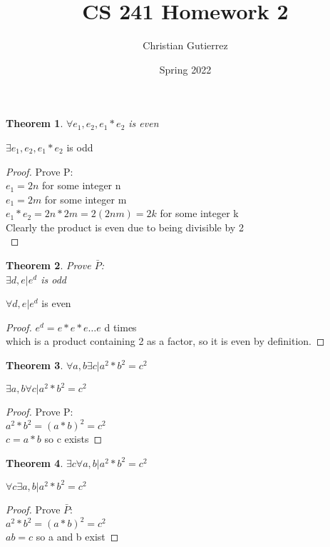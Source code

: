\documentclass{article}
\title{CS 241 Homework 2}
\author{Christian Gutierrez}
\date{Spring 2022}
\newtheorem{theorem}{Theorem}
\begin{document}
\maketitle

\newpage
\begin{theorem}
    $\forall e_{1},e_{2},e_{1}*e_{2}$ is even
\end{theorem}
\begin{negated}
  \item $\exists e_{1},e_{2},e_{1}*e_{2}$ is odd
\end{negated}
\begin{proof}
    Prove P:\\
    $e_{1} = 2n$ for some integer n \\
    $e_{1} = 2m$ for some integer m \\
    $e_{1}*e_{2}=2n*2m=2(2nm)=2k$ for some integer k\\
    Clearly the product is even due to being divisible by 2\\
\end{proof}

\begin{theorem}
  Prove $\bar{P}$:\\
  $\exists d, e| e^{d}$ is odd
\end{theorem}
\begin{negated}
\item $\forall d, e| e^{d}$ is even
\end{negated}
\begin{proof}
  $e^{d} = e*e*e\ldots e$ d times \\
  which is a product containing 2 as a factor, so it is even by definition.
\end{proof}

\begin{theorem}
  $\forall a,b\exists c | a^{2}*b^{2}=c^{2}$
\end{theorem}
\begin{negated}
\item $\exists a,b \forall c | a^{2}*b^{2}=c^{2}$
\end{negated}
\begin{proof}
  Prove P:\\
  $a^{2}*b^{2}=(a*b)^{2} = c^{2}$\\
  $c=a*b$ so c exists
\end{proof}

\begin{theorem}
  $\exists c \forall a,b  | a^{2}*b^{2}=c^{2}$
\end{theorem}
\begin{negated}
\item $\forall c \exists a,b  | a^{2}*b^{2}=c^{2}$
\end{negated}
\begin{proof}
  Prove $\bar{P}$:\\
  $a^{2}*b^{2}=(a*b)^{2} = c^{2}$\\
  $ab=c$ so a and b exist
\end{proof}
\end{document}
